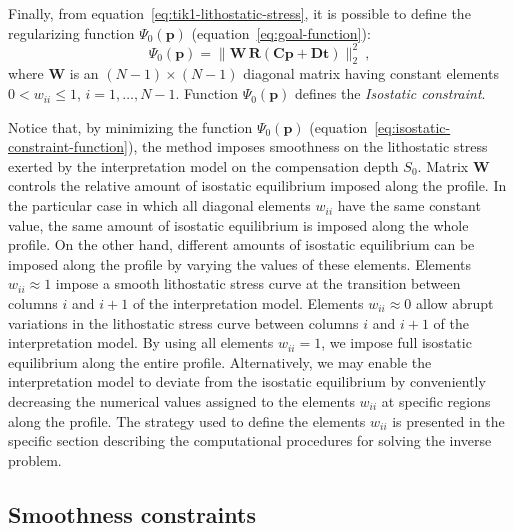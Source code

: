 \documentclass[manuscript]{geophysics}
\begin{document}
Finally, from equation~\ref{eq:tik1-lithostatic-stress}, it is possible to
define the regularizing function $\Psi_{0}(\mathbf{p})$ 
(equation~\ref{eq:goal-function}): 
\begin{equation}
\Psi_{0}(\mathbf{p}) = \| \mathbf{W} \, \mathbf{R} \left( \mathbf{C} \mathbf{p} + \mathbf{D}
\mathbf{t} \right) \|_{2}^{2} \: ,
\label{eq:isostatic-constraint-function}
\end{equation}
where $\mathbf{W}$ is an $(N - 1) \times (N - 1)$ diagonal matrix having constant
elements $0 < w_{ii} \le 1$, $i = 1, \dots, N - 1$. 
Function $\Psi_{0}(\mathbf{p})$ defines the \textit{Isostatic constraint}.

Notice that, by minimizing the function $\Psi_{0}(\mathbf{p})$ 
(equation~\ref{eq:isostatic-constraint-function}), the method imposes smoothness on 
the lithostatic stress exerted by the interpretation model on the 
compensation depth $S_{0}$.
Matrix $\mathbf{W}$ controls the relative amount of isostatic equilibrium imposed 
along the profile. 
In the particular case in which all diagonal elements $w_{ii}$ have the same
constant value, the same amount of isostatic equilibrium is imposed along the 
whole profile. On the other hand, different amounts of isostatic equilibrium
can be imposed along the profile by varying the values of these elements.
Elements $w_{ii} \approx 1$ impose a smooth lithostatic stress curve 
at the transition between columns $i$ and $i+1$ of the interpretation model.
Elements $w_{ii} \approx 0$ allow abrupt variations in the lithostatic stress 
curve between columns $i$ and $i+1$ of the interpretation model.
By using all elements $w_{ii} = 1$, we impose full isostatic equilibrium 
along the entire profile. Alternatively, we may enable the interpretation model 
to deviate from the isostatic equilibrium by conveniently decreasing the numerical values
assigned to the elements $w_{ii}$ at specific regions along the profile. 
The strategy used to define the elements $w_{ii}$ is 
presented in the specific section describing the computational procedures
for solving the inverse problem.


\subsection{Smoothness constraints}
\end{document}
